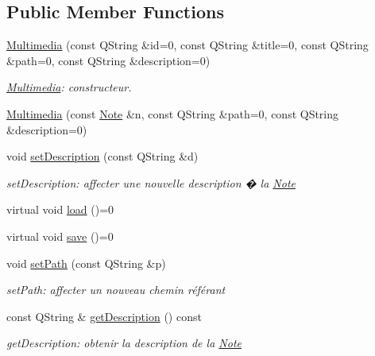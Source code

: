 \subsection*{Public Member Functions}
\begin{DoxyCompactItemize}
\item 
\hyperlink{class_notes_module_1_1_multimedia_ace5497afd6842429a39316d6568bd9df}{Multimedia} (const Q\-String \&id=0, const Q\-String \&title=0, const Q\-String \&path=0, const Q\-String \&description=0)
\begin{DoxyCompactList}\small\item\em \hyperlink{class_notes_module_1_1_multimedia}{Multimedia}\-: constructeur. \end{DoxyCompactList}\item 
\hyperlink{class_notes_module_1_1_multimedia_a1cc0bde00eef2c506b92629a18f2fc9b}{Multimedia} (const \hyperlink{class_notes_module_1_1_note}{Note} \&n, const Q\-String \&path=0, const Q\-String \&description=0)
\item 
void \hyperlink{class_notes_module_1_1_multimedia_a37734d02d1de1b2d8013477f3abe63ee}{set\-Description} (const Q\-String \&d)
\begin{DoxyCompactList}\small\item\em set\-Description\-: affecter une nouvelle description � la \hyperlink{class_notes_module_1_1_note}{Note} \end{DoxyCompactList}\item 
virtual void \hyperlink{class_notes_module_1_1_multimedia_af567d9c6e680914fccd775c9b3c6d439}{load} ()=0
\item 
virtual void \hyperlink{class_notes_module_1_1_multimedia_a06a7716c7b09908813ceb3cd79ab81cb}{save} ()=0
\item 
void \hyperlink{class_notes_module_1_1_multimedia_ab3ff034d77ecae83ce4502b66e960ddc}{set\-Path} (const Q\-String \&p)
\begin{DoxyCompactList}\small\item\em set\-Path\-: affecter un nouveau chemin référant \end{DoxyCompactList}\item 
const Q\-String \& \hyperlink{class_notes_module_1_1_multimedia_aa93321f835dc4a2128a34ec399f33476}{get\-Description} () const 
\begin{DoxyCompactList}\small\item\em get\-Description\-: obtenir la description de la \hyperlink{class_notes_module_1_1_note}{Note} \end{DoxyCompactList}\item 

\end{DoxyCompactItemize}
